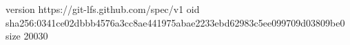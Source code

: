 version https://git-lfs.github.com/spec/v1
oid sha256:0341ce02dbbb4576a3cc8ae441975abae2233ebd62983c5ee099709d03809be0
size 20030
